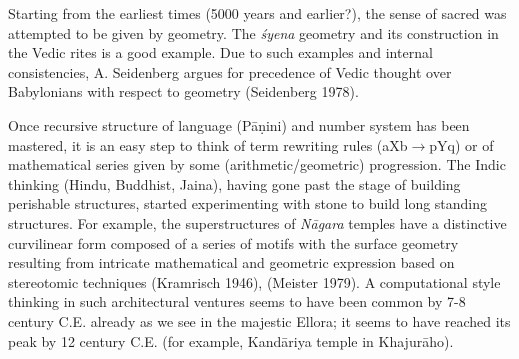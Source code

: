 Starting from the earliest times (5000 years and earlier?), the sense of sacred was attempted to be given by geometry. The \textsl{śyena} geometry and its construction in the Vedic rites is a good example. Due to such examples and internal consistencies, A. Seidenberg argues for precedence of Vedic thought over Babylonians with respect to geometry (Seidenberg 1978).

Once recursive structure of language (Pāṇini) and number system has been mastered, it is an easy step to think of term rewriting rules (aXb$\to$pYq) or of mathematical series given by some (arithmetic/geometric) progression. The Indic thinking (Hindu, Buddhist, Jaina), having gone past the stage of building perishable structures, started experimenting with stone to build long standing structures. For example, the superstructures of \textsl{Nāgara} temples have a distinctive curvilinear form composed of a series of motifs with the surface geometry resulting from intricate mathematical and geometric expression based on stereotomic techniques (Kramrisch 1946), (Meister 1979).  A computational style thinking in such architectural ventures seems to have been common by 7-8 century C.E. already as we see in the majestic Ellora; it seems to have reached its peak by 12 century C.E. (for example, Kandāriya temple in Khajurāho). 

